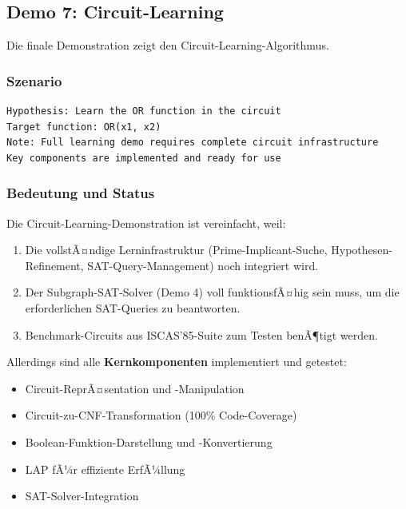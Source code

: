 ﻿\documentclass[a4paper,12pt]{article}
\theoremstyle{definition}
\begin{document}
\subsection{Demo 7: Circuit-Learning}

Die finale Demonstration zeigt den Circuit-Learning-Algorithmus.

\subsubsection{Szenario}

\begin{lstlisting}
Hypothesis: Learn the OR function in the circuit
Target function: OR(x1, x2)
Note: Full learning demo requires complete circuit infrastructure
Key components are implemented and ready for use
\end{lstlisting}

\subsubsection{Bedeutung und Status}

Die Circuit-Learning-Demonstration ist vereinfacht, weil:

\begin{enumerate}
    \item Die vollstÃ¤ndige Lerninfrastruktur (Prime-Implicant-Suche, Hypothesen-Refinement, SAT-Query-Management) noch integriert wird.
    
    \item Der Subgraph-SAT-Solver (Demo 4) voll funktionsfÃ¤hig sein muss, um die erforderlichen SAT-Queries zu beantworten.
    
    \item Benchmark-Circuits aus ISCAS'85-Suite zum Testen benÃ¶tigt werden.
\end{enumerate}

Allerdings sind alle \textbf{Kernkomponenten} implementiert und getestet:
\begin{itemize}
    \item Circuit-ReprÃ¤sentation und -Manipulation
    \item Circuit-zu-CNF-Transformation (100\% Code-Coverage)
    \item Boolean-Funktion-Darstellung und -Konvertierung
    \item LAP fÃ¼r effiziente ErfÃ¼llung
    \item SAT-Solver-Integration
\end{itemize}
\end{document}
